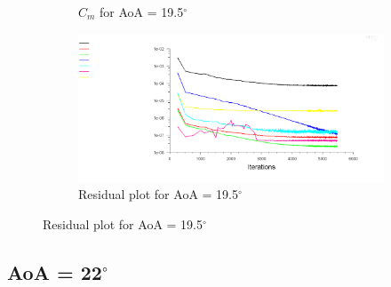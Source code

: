 \begin{figure}[H]
\begin{subfigure}[b]{0.5\textwidth}
    \caption{$C_m$ for AoA = 19.5$^\circ$}
    \label{fig:aoa_19.5_cm}
  \end{subfigure}
  \begin{subfigure}[b]{0.5\textwidth}
    \includegraphics[width=\textwidth]{19.5_deg/AoA_19_5_resid.png}
    \caption{Residual plot for AoA = 19.5$^\circ$}
    \label{fig:aoa_19.5_resid}
  \end{subfigure}
\end{figure}

\subsection*{AoA = 22$^\circ$}

